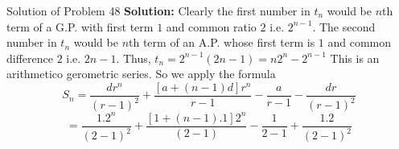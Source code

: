 \documentclass[aspectratio=1610,8pt]{beamer}
\begin{document}
\begin{frame}{Solution of Problem 48}
  \textbf{Solution:} Clearly the first number in $t_n$ would be $n$th term of a G.P. with first term $1$ and common ratio $2$
  i.e. $2^{n - 1}.$ The second number in $t_n$ would be $n$th term of an A.P. whose first term is $1$ and common difference $2$
  i.e. $2n - 1.$ Thus, $t_n = 2^{n - 1}(2n - 1) = n2^n - 2^{n - 1}$
  \vspace{5mm}\linebreak
  This is an arithmetico gerometric series. So we apply the formula
  $$S_n = \frac{dr^n}{(r - 1)^2} + \frac{[a + (n - 1)d]r^n}{r - 1} -\frac{a}{r - 1} - \frac{dr}{(r - 1)^2}$$
  $$= \frac{1.2^n}{(2 - 1)^2} + \frac{[1 + (n - 1).1]2^n}{(2 - 1)} - \frac{1}{2 - 1} + \frac{1.2}{(2 - 1)^2}$$
\end{frame}
\end{document}
